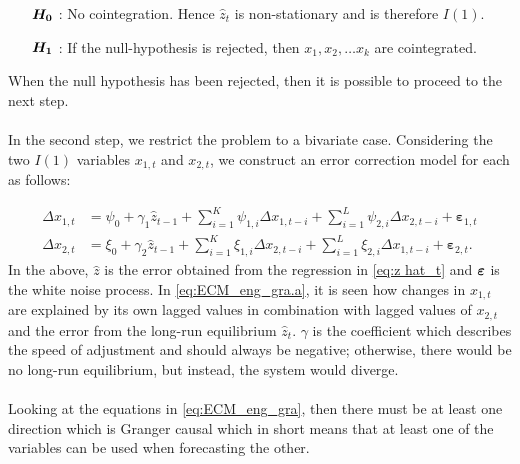 \begin{itemize}
\centering
    \item[$\boldsymbol{H_0}$] : No cointegration. Hence $\hat{z}_t$ is non-stationary and is therefore $I(1)$.
    \item [$\boldsymbol{H_1}$] : If the null-hypothesis is rejected, then $x_1,x_2,\ldots x_k$ are cointegrated.
\end{itemize}
When the null hypothesis has been rejected, then it is possible to proceed to the next step.\\\\
In the second step, we restrict the problem to a bivariate case. Considering the two $I(1)$ variables $x_{1,t}$ and $x_{2,t}$, we construct an error correction model for each as follows:

\begin{subequations}\label{eq:ECM_eng_gra}
\begin{align}
    \Delta x_{1,t} &= \psi_0 + \gamma_1 \hat{z}_{t-1} + \sum^K_{i=1} \psi_{1,i} \Delta x_{1,t-i} + \sum^L_{i=1} \psi_{2,i} \Delta x_{2,t-i} + \boldsymbol{\varepsilon}_{1,t} \label{eq:ECM_eng_gra.a} \\
    \Delta x_{2,t} &= \xi_0 + \gamma_2 \hat{z}_{t-1} + \sum^K_{i=1} \xi_{1,i} \Delta x_{2,t-i} + \sum^L_{i=1} \xi_{2,i} \Delta x_{1,t-i} + \boldsymbol{\varepsilon}_{2,t}. \label{eq:ECM_eng_gra.b}
\end{align}
\end{subequations}
In the above, $\hat{z}$ is the error obtained from the regression in \eqref{eq:z hat_t} and $\boldsymbol{\varepsilon}$ is the white noise process. In \eqref{eq:ECM_eng_gra.a}, it is seen how changes in $x_{1,t}$ are explained by its own lagged values in combination with lagged values of $x_{2,t}$ and the error from the long-run equilibrium $\hat{z}_t$. $\gamma$ is the coefficient which describes the speed of adjustment and should always be negative; otherwise, there would be no long-run equilibrium, but instead, the system would diverge.\\\\
Looking at the equations in \eqref{eq:ECM_eng_gra}, then there must be at least one direction which is Granger causal which in short means that at least one of the variables can be used when forecasting the other.

